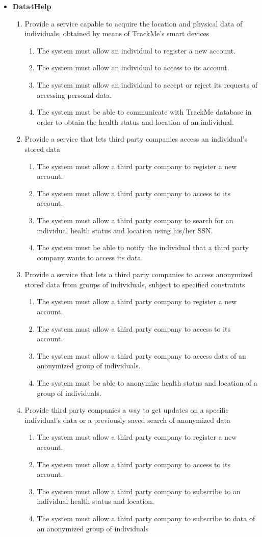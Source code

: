 \documentclass[12pt]{article}
\newcommand\requirement[1]{\item[{[R#1]}] }
\newcommand\goal[1]{\item[{[G#1]}] }
\begin{document}
\begin{itemize}
  \item{\textbf{Data4Help}}
  \begin{enumerate}
    \goal{1} Provide a service capable to acquire the location and physical data of individuals, obtained by means of TrackMe's smart devices
    \begin{enumerate}
      \requirement{1} The system must allow an individual to register a new account.
      \requirement{2} The system must allow an individual to access to its account.
      \requirement{3} The system must allow an individual to accept or reject its requests of accessing personal data.
      \requirement{4} The system must be able to communicate with TrackMe database in order to obtain the health status and location of an individual.
    \end{enumerate}
    \goal{2} Provide a service that lets third party companies access an individual's stored data 
    \begin{enumerate}
      \requirement{5} The system must allow a third party company to register a new account.
      \requirement{6} The system must allow a third party company to access to its account.
      \requirement{7} The system must allow a third party company to search for an individual health status and location using his/her SSN.
      \requirement{8} The system must be able to notify the individual that a third party company wants to access its data.
    \end{enumerate}
    \goal{3} Provide a service that lets a third party companies to access anonymized stored data from groups of individuals, subject to specified constraints
    \begin{enumerate}
      \requirement{5} The system must allow a third party company to register a new account.
      \requirement{6} The system must allow a third party company to access to its account.
      \requirement{9} The system must allow a third party company to access data of an anonymized group of individuals.
      \requirement{10} The system must be able to anonymize health status and location of a group of individuals.
    \end{enumerate}
    \goal{4} Provide third party companies a way to get updates on a specific individual's data or a previously saved search of anonymized data
    \begin{enumerate}
      \requirement{5} The system must allow a third party company to register a new account.
      \requirement{6} The system must allow a third party company to access to its account.
      \requirement{11} The system must allow a third party company to subscribe to an individual health status and location.
      \requirement{12} The system must allow a third party company to subscribe to data of an anonymized group of individuals
    \end{enumerate}
  \end{enumerate}
  

\end{itemize}
\end{document}
